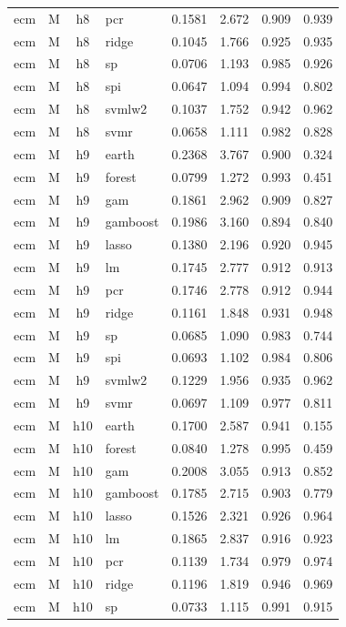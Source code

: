 \begin{ThreePartTable}
\begin{longtable}[t]{llclcccc}
ecm & M & h8 & pcr & 0.1581 & 2.672 & 0.909 & 0.939\\
ecm & M & h8 & ridge & 0.1045 & 1.766 & 0.925 & 0.935\\
ecm & M & h8 & sp & 0.0706 & 1.193 & 0.985 & 0.926\\
ecm & M & h8 & spi & 0.0647 & 1.094 & 0.994 & 0.802\\
ecm & M & h8 & svmlw2 & 0.1037 & 1.752 & 0.942 & 0.962\\
ecm & M & h8 & svmr & 0.0658 & 1.111 & 0.982 & 0.828\\
\addlinespace
ecm & M & h9 & earth & 0.2368 & 3.767 & 0.900 & 0.324\\
ecm & M & h9 & forest & 0.0799 & 1.272 & 0.993 & 0.451\\
ecm & M & h9 & gam & 0.1861 & 2.962 & 0.909 & 0.827\\
ecm & M & h9 & gamboost & 0.1986 & 3.160 & 0.894 & 0.840\\
ecm & M & h9 & lasso & 0.1380 & 2.196 & 0.920 & 0.945\\
ecm & M & h9 & lm & 0.1745 & 2.777 & 0.912 & 0.913\\
ecm & M & h9 & pcr & 0.1746 & 2.778 & 0.912 & 0.944\\
ecm & M & h9 & ridge & 0.1161 & 1.848 & 0.931 & 0.948\\
ecm & M & h9 & sp & 0.0685 & 1.090 & 0.983 & 0.744\\
ecm & M & h9 & spi & 0.0693 & 1.102 & 0.984 & 0.806\\
ecm & M & h9 & svmlw2 & 0.1229 & 1.956 & 0.935 & 0.962\\
ecm & M & h9 & svmr & 0.0697 & 1.109 & 0.977 & 0.811\\
\addlinespace
ecm & M & h10 & earth & 0.1700 & 2.587 & 0.941 & 0.155\\
ecm & M & h10 & forest & 0.0840 & 1.278 & 0.995 & 0.459\\
ecm & M & h10 & gam & 0.2008 & 3.055 & 0.913 & 0.852\\
ecm & M & h10 & gamboost & 0.1785 & 2.715 & 0.903 & 0.779\\
ecm & M & h10 & lasso & 0.1526 & 2.321 & 0.926 & 0.964\\
ecm & M & h10 & lm & 0.1865 & 2.837 & 0.916 & 0.923\\
ecm & M & h10 & pcr & 0.1139 & 1.734 & 0.979 & 0.974\\
ecm & M & h10 & ridge & 0.1196 & 1.819 & 0.946 & 0.969\\
ecm & M & h10 & sp & 0.0733 & 1.115 & 0.991 & 0.915\\

\end{longtable}
\end{ThreePartTable}
